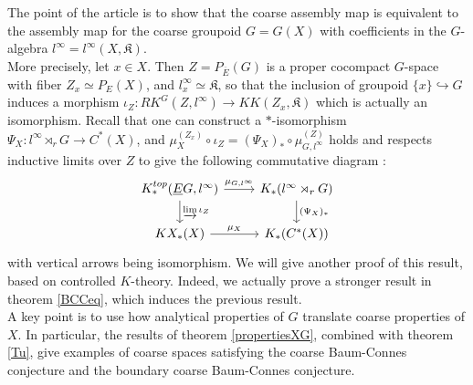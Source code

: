 The point of the article \cite{SkTuYu} is to show that the coarse assembly map is equivalent to the assembly map for the coarse groupoid $G=G(X)$ with coefficients in the $G$-algebra $l^\infty=l^\infty(X,\mathfrak K)$. \\

More precisely, let $x\in X$. Then $Z=P_{\overline E}(G)$ is a proper cocompact $G$-space with fiber $Z_x\simeq P_E(X)$, and $l^\infty_x \simeq \mathfrak K$, so that the inclusion of groupoid $\{x\}\hookrightarrow G $ induces a morphism $\iota_Z : RK^G(Z,l^\infty)\rightarrow KK(Z_x,\mathfrak K)$ which is actually an isomorphism. Recall that one can construct a $*$-isomorphism $\Psi_X: l^\infty \rtimes_r G\rightarrow C^*(X)$, and $\mu_X^{(Z_x)}\circ \iota_Z = (\Psi_X)_*\circ \mu_{G,l^\infty}^{(Z)}$ holds and respects inductive limits over $Z$ to give the following commutative diagram :
\[\begin{tikzcd}
K_*^{top}(\underline E G, l^\infty) \arrow{r}{\mu_{G,l^\infty}}\arrow{d}{\varinjlim \iota_Z} & K_*(l^\infty\rtimes_r G)\arrow{d}{(\Psi_X)_*} \\
KX_*(X)\arrow{r}{\mu_X} & K_*(C^*(X))
\end{tikzcd}\]  
with vertical arrows being isomorphism. We will give another proof of this result, based on controlled $K$-theory. Indeed, we actually prove a stronger result in theorem \ref{BCCeq}, which induces the previous result. \\

A key point is to use how analytical properties of $G$ translate coarse properties of $X$. In particular, the results of theorem \ref{propertiesXG}, combined with theorem \ref{Tu}, give examples of coarse spaces satisfying the coarse Baum-Connes conjecture and the boundary coarse Baum-Connes conjecture.

















